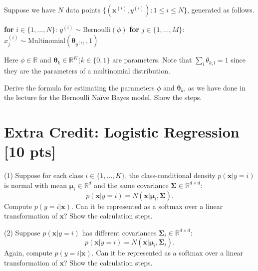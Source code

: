 \documentclass[a4paper]{article}
\theoremstyle{definition}
\begin{document}
Suppose we have $N$ data points $\{(\mathbf{x}^{(i)}, y^{(i)}): 1 \le i \le N\}$, generated as follows.
\begin{algorithmic}
\STATE \textbf{for} $i \in \{1, \ldots, N\}$: 
\STATE \quad $y^{(i)} \sim \text{Bernoulli}(\phi)$
\STATE \quad \textbf{for} $j \in \{1, \ldots, M\}$:
\STATE \quad \quad $x_j^{(i)} \sim \text{Multinomial}(\mathbf{\theta}_{y^{(i)}}, 1)$
\end{algorithmic}
Here $\phi \in \mathbb{R}$ and $\mathbf{\theta}_k \in \mathbb{R}^{K} (k \in \{0,1\}$ are parameters. Note that $\sum_l \theta_{k, l} = 1$ since they are the parameters of a multinomial distribution.

Derive the formula for estimating the parameters $\phi$ and $\mathbf{\theta}_k$, as we have done in the lecture for the Bernoulli Na\"ive Bayes model. Show the steps.


\section*{Extra Credit: Logistic Regression [10 pts]}
(1) Suppose for each class $i \in \{1,\ldots, K\}$, the class-conditional density $p(\mathbf{x}| y = i)$ is normal with mean $\mathbf{\mu}_i \in \mathbb{R}^d$ and the same covariance $\mathbf{\Sigma} \in \mathbb{R}^{d \times d}$: 
\[
  p(\mathbf{x} | y=i) = N(\mathbf{x}| \mathbf{\mu}_i, \mathbf{\Sigma}).
\]
Compute $p(y=i|\mathbf{x})$. Can it be represented as a softmax over a linear transformation of $\mathbf{x}$? Show the calculation steps.

(2) Suppose $p(\mathbf{x}| y = i)$ has different covariances $\mathbf{\Sigma}_i \in \mathbb{R}^{d \times d}$: 
\[
  p(\mathbf{x} | y=i) = N(\mathbf{x}| \mathbf{\mu}_i, \mathbf{\Sigma}_i).
\]
Again, compute $p(y=i|\mathbf{x})$. Can it be represented as a softmax over a linear transformation of $\mathbf{x}$? Show the calculation steps.
\end{document}
